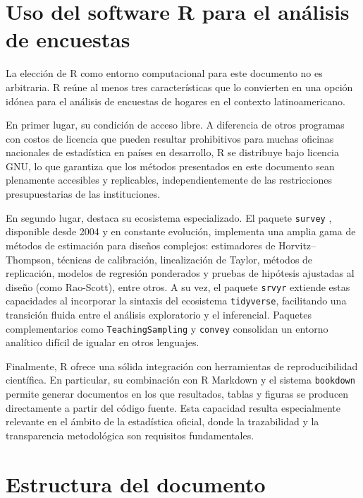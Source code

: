 \documentclass[
  spanish,
  12pt,
]{book}
\begin{document}
\section{Uso del software R para el análisis de encuestas}\label{uso-del-software-r-para-el-analisis-de-encuestas}

La elección de R como entorno computacional para este documento no es arbitraria. R reúne al menos tres características que lo convierten en una opción idónea para el análisis de encuestas de hogares en el contexto latinoamericano.

En primer lugar, su condición de acceso libre. A diferencia de otros programas con costos de licencia que pueden resultar prohibitivos para muchas oficinas nacionales de estadística en países en desarrollo, R se distribuye bajo licencia GNU, lo que garantiza que los métodos presentados en este documento sean plenamente accesibles y replicables, independientemente de las restricciones presupuestarias de las instituciones.

En segundo lugar, destaca su ecosistema especializado. El paquete \texttt{survey} \citep{Lumley2024}, disponible desde 2004 y en constante evolución, implementa una amplia gama de métodos de estimación para diseños complejos: estimadores de Horvitz--Thompson, técnicas de calibración, linealización de Taylor, métodos de replicación, modelos de regresión ponderados y pruebas de hipótesis ajustadas al diseño (como Rao-Scott), entre otros. A su vez, el paquete \texttt{srvyr} \citep{Freedman2024} extiende estas capacidades al incorporar la sintaxis del ecosistema \texttt{tidyverse}, facilitando una transición fluida entre el análisis exploratorio y el inferencial. Paquetes complementarios como \texttt{TeachingSampling} \citep{GutierrezT2020} y \texttt{convey} \citep{convey2024} consolidan un entorno analítico difícil de igualar en otros lenguajes.

Finalmente, R ofrece una sólida integración con herramientas de reproducibilidad científica. En particular, su combinación con R Markdown y el sistema \texttt{bookdown} permite generar documentos en los que resultados, tablas y figuras se producen directamente a partir del código fuente. Esta capacidad resulta especialmente relevante en el ámbito de la estadística oficial, donde la trazabilidad y la transparencia metodológica son requisitos fundamentales.

\section{Estructura del documento}\label{estructura-del-documento}
\end{document}
